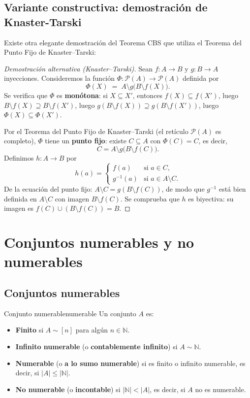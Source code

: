 \subsection{Variante constructiva: demostración de Knaster-Tarski}

Existe otra elegante demostración del Teorema CBS que utiliza el Teorema del Punto Fijo de Knaster–Tarski:

\begin{proof}[Demostración alternativa (Knaster--Tarski)]
Sean $f: A \to B$ y $g: B \to A$ inyecciones. Consideremos la función $\Phi: \mathcal{P}(A) \to \mathcal{P}(A)$ definida por
\[
  \Phi(X) \;=\; A \setminus g\!\bigl(B \setminus f(X)\bigr).
\]
Se verifica que $\Phi$ es \textbf{monótona}: si $X \subseteq X'$, entonces $f(X) \subseteq f(X')$, luego $B \setminus f(X) \supseteq B \setminus f(X')$, luego $g(B \setminus f(X)) \supseteq g(B \setminus f(X'))$, luego $\Phi(X) \subseteq \Phi(X')$.

Por el Teorema del Punto Fijo de Knaster–Tarski (el retículo $\mathcal{P}(A)$ es completo), $\Phi$ tiene un \textbf{punto fijo}: existe $C \subseteq A$ con $\Phi(C) = C$, es decir,
\[
  C = A \setminus g\!\bigl(B \setminus f(C)\bigr).
\]
Definimos $h: A \to B$ por
\[
  h(a) = \begin{cases} f(a) & \text{si } a \in C, \\ g^{-1}(a) & \text{si } a \in A \setminus C. \end{cases}
\]
De la ecuación del punto fijo: $A \setminus C = g(B \setminus f(C))$, de modo que $g^{-1}$ está bien definida en $A \setminus C$ con imagen $B \setminus f(C)$. Se comprueba que $h$ es biyectiva: su imagen es $f(C) \cup (B \setminus f(C)) = B$.
\end{proof}

\section{Conjuntos numerables y no numerables}

\subsection{Conjuntos numerables}

\begin{definicion}{Conjunto numerable}{numerable}
Un conjunto $A$ es:
\begin{itemize}[leftmargin=2em]
  \item \textbf{Finito} si $A \sim [n]$ para algún $n \in \mathbb{N}$.
  \item \textbf{Infinito numerable} (o \textbf{contablemente infinito}) si $A \sim \mathbb{N}$.
  \item \textbf{Numerable} (o \textbf{a lo sumo numerable}) si es finito o infinito numerable, es decir, si $|A| \leq |\mathbb{N}|$.
  \item \textbf{No numerable} (o \textbf{incontable}) si $|\mathbb{N}| < |A|$, es decir, si $A$ no es numerable.
\end{itemize}
\end{definicion}

